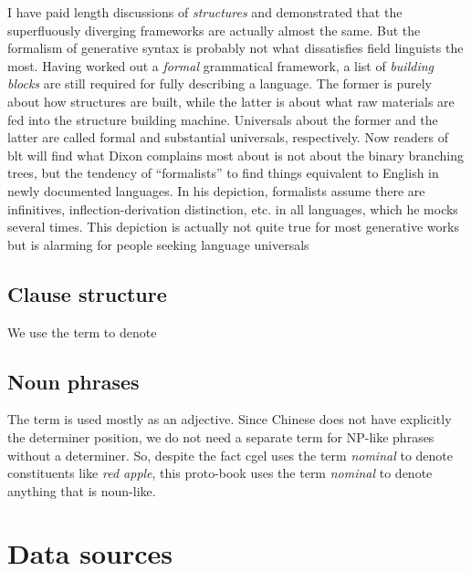 \documentclass[../main.tex]{subfiles}
\begin{document}
I have paid length discussions of \emph{structures} and demonstrated that the superfluously diverging 
frameworks are actually almost the same. But the formalism of generative syntax is probably not 
what dissatisfies field linguists the most.
Having worked out a \emph{formal} grammatical framework, a list of \emph{building blocks} 
are still required for fully describing a language. The former is purely about 
how structures are built, while the latter is about what raw materials are fed into the structure 
building machine. Universals about the former and the latter are called formal and substantial universals,
respectively. Now readers of \ac{blt} will find what Dixon complains most about is not about the 
binary branching trees, but the tendency of ``formalists'' to find things equivalent to English 
in newly documented languages. In his depiction, formalists assume there are infinitives, 
inflection-derivation distinction, etc. in all languages, which he mocks several times. 
This depiction is actually not quite true for most generative works but is 
alarming for people seeking language universals %

\subsection{Clause structure}

We use the term  to denote %


\subsection{Noun phrases}

The term  is used mostly as an adjective. Since Chinese does not have 
explicitly the determiner position, we do not need a separate term for NP-like phrases without a determiner.
So, despite the fact \ac{cgel} uses the term \emph{nominal} to denote constituents like \emph{red apple}, 
this proto-book uses the term \emph{nominal} to denote anything that is noun-like.

\section{Data sources}

\end{document}
